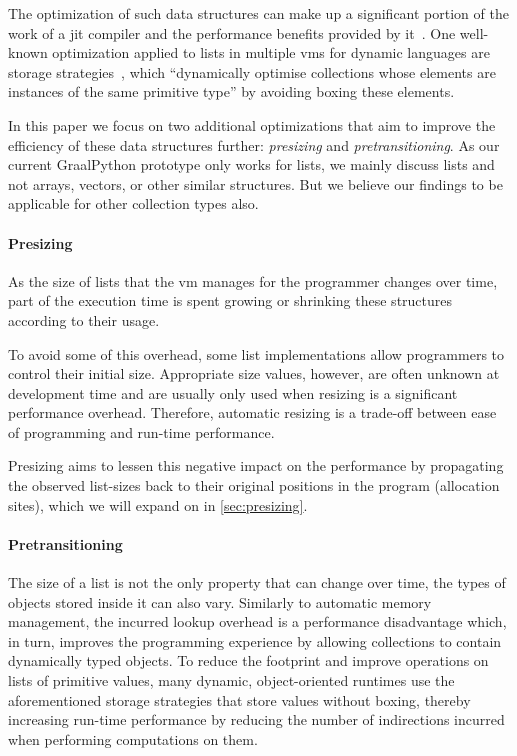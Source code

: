 \documentclass[sigconf, review, balance=false]{acmart}
\newcommand{\ac}[1]{\gls*{#1}}
\newcommand{\acp}[1]{\glspl*{#1}}
\begin{document}
The optimization of such data structures can make up a significant
portion of the work of a \ac{jit} compiler and the performance
benefits provided by it~\cite{gal2009trace}. One well-known
optimization applied to lists in multiple \acp{vm} for dynamic
languages are storage strategies~\cite{bolz2013storage,
grimmer2017applying, pape2015language}, which ``dynamically optimise
collections whose elements are instances of the same primitive
type''\cite{bolz2013storage} by avoiding boxing these elements.

In this paper we focus on two additional optimizations that aim to
improve the efficiency of these data structures further:
\emph{presizing} and \emph{pretransitioning}. As our current
GraalPython prototype only works for lists, we mainly discuss
lists and not arrays, vectors, or other similar structures. But we
believe our findings to be applicable for other collection types also.
\paragraph{Presizing} As the size of lists that the \ac{vm} manages
for the programmer changes over time, part of the execution time is
spent growing or shrinking these structures according to their usage.

To avoid some of this overhead, some list implementations allow
programmers to control their initial size.  Appropriate size values,
however, are often unknown at development time and are usually only
used when resizing is a significant performance overhead.  Therefore,
automatic resizing is a trade-off between ease of programming and
run-time performance.

Presizing aims to lessen this negative impact on the performance by
propagating the observed list-sizes back to their original positions
in the program (allocation sites), which we will expand on in
\autoref{sec:presizing}.


\paragraph{Pretransitioning} The size of a list is not the only
property that can change over time, the types of objects stored
inside it can also vary. Similarly to automatic memory management, the
incurred lookup overhead is a performance disadvantage which, in
turn, improves the programming experience by allowing collections to
contain dynamically typed objects. To reduce the footprint and improve
operations on lists of primitive values, many dynamic,
object-oriented runtimes use the aforementioned storage strategies
that store values without boxing, thereby increasing run-time
performance by reducing the number of indirections incurred when
performing computations on them. 
\end{document}
